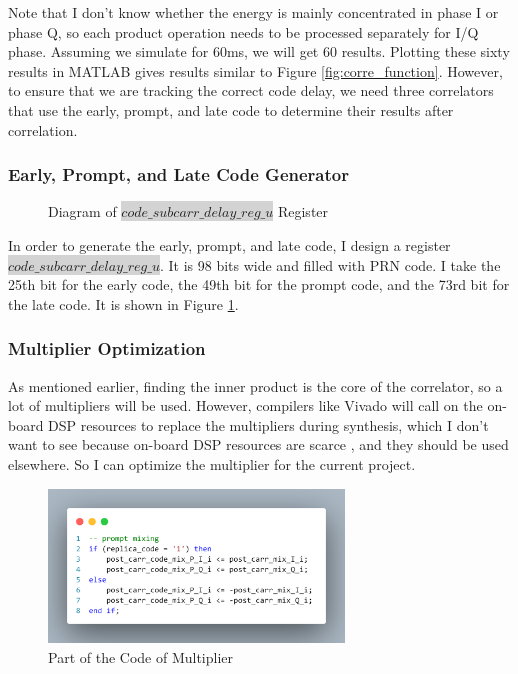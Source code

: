 Note that I don't know whether the energy is mainly concentrated in phase I or phase Q, so each product operation needs to be processed separately for I/Q phase. Assuming we simulate for 60ms, we will get 60 results. Plotting these sixty results in MATLAB gives results similar to Figure \ref{fig:corre_function}. However, to ensure that we are tracking the correct code delay, we need three correlators that use the early, prompt, and late code to determine their results after correlation.

\subsubsection{Early, Prompt, and Late Code Generator}
\begin{figure}[!htbp]
    \centering
    
    \caption{Diagram of \colorbox{lightgray}{$code\_subcarr\_delay\_reg\_u$} Register}
    \label{fig:prompt_code}
\end{figure}

In order to generate the early, prompt, and late code, I design a register\\ \colorbox{lightgray}{$code\_subcarr\_delay\_reg\_u$}. It is 98 bits wide and filled with PRN  code. I take the 25th bit for the early code, the 49th bit for the prompt code, and the 73rd bit for the late code. It is shown in Figure \ref{fig:prompt_code}.

\subsubsection{Multiplier Optimization}
As mentioned earlier, finding the inner product is the core of the correlator, so a lot of multipliers will be used. However, compilers like Vivado will call on the on-board DSP resources to replace the multipliers during synthesis, which I don't want to see because on-board DSP resources are scarce \cite{RN208, RN209}, and they should be used elsewhere. So I can optimize the multiplier for the current project.

\begin{figure}[!htbp]
    \centering
    \includegraphics[width=0.7\textwidth]{_IMAGES/multiplier_code.png}
    \caption{Part of the Code of Multiplier}
    \label{fig:multiplier_code}
\end{figure}

